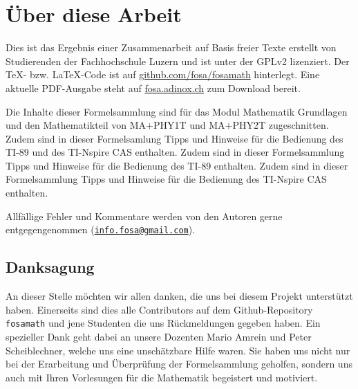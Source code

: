 



\chapter*{Über diese Arbeit}
Dies ist das Ergebnis einer Zusammenarbeit auf Basis freier Texte erstellt von 
Studierenden der Fachhochschule Luzern und ist unter der GPLv2 lizenziert. 
Der \TeX - bzw. \LaTeX -Code ist auf \url{github.com/fosa/fosamath} 
hinterlegt. Eine aktuelle PDF-Ausgabe steht auf \url{fosa.adinox.ch} zum 
Download bereit.

Die Inhalte dieser Formelsammlung sind für das Modul Mathematik Grundlagen 
und den Mathematikteil von MA+PHY1T und MA+PHY2T zugeschnitten. 
%
\iftiboth
	Zudem sind in dieser Formelsamlung Tipps und Hinweise für die Bedienung 
    des TI-89 und des TI-Nspire CAS enthalten. 
	\else
	\ifti
		Zudem sind in dieser Formelsammlung Tipps und Hinweise für die 
        Bedienung des TI-89 enthalten. 
	\fi
	\ifnspire
		Zudem sind in dieser Formelsammlung Tipps und Hinweise für die 
        Bedienung des TI-Nspire CAS enthalten. 
	\fi
\fi

Allfällige Fehler und Kommentare werden von den Autoren gerne entgegengenommen
(\href{mailto:info.fosa@gmail.com}{\nolinkurl{info.fosa@gmail.com}}).

\section*{Danksagung}
An dieser Stelle möchten wir allen danken, die uns bei diesem Projekt 
unterstützt haben.
Einerseits sind dies alle Contributors auf dem Github-Repository 
\verb!fosamath! und jene Studenten die uns Rückmeldungen gegeben haben.
Ein spezieller Dank geht dabei an unsere Dozenten Mario Amrein und Peter 
Scheiblechner, welche uns eine unschätzbare Hilfe waren.
Sie haben uns nicht nur bei der Erarbeitung und Überprüfung der Formelsammlung 
geholfen, sondern uns auch mit Ihren Vorlesungen für die Mathematik begeistert 
und motiviert.


